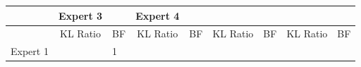 \documentclass[openright,titlepage,12pt,a4paper]{book}
\begin{document}
\begin{longtable}[]{@{}lclclclcl@{}}
\begin{minipage}[b]{0.06\columnwidth}
\strut
\end{minipage} & \begin{minipage}[b]{0.11\columnwidth}\centering
Expert 3\strut
\end{minipage} & \begin{minipage}[b]{0.07\columnwidth}\raggedright
\strut
\end{minipage} & \begin{minipage}[b]{0.10\columnwidth}\centering
Expert 4\strut
\end{minipage} & \begin{minipage}[b]{0.06\columnwidth}\raggedright
\strut
\end{minipage}\tabularnewline
\midrule
\endhead
\begin{minipage}[t]{0.11\columnwidth}\raggedright
\strut
\end{minipage} & \begin{minipage}[t]{0.10\columnwidth}\centering
KL Ratio\strut
\end{minipage} & \begin{minipage}[t]{0.06\columnwidth}\raggedright
BF\strut
\end{minipage} & \begin{minipage}[t]{0.11\columnwidth}\centering
KL Ratio\strut
\end{minipage} & \begin{minipage}[t]{0.06\columnwidth}\raggedright
BF\strut
\end{minipage} & \begin{minipage}[t]{0.11\columnwidth}\centering
KL Ratio\strut
\end{minipage} & \begin{minipage}[t]{0.07\columnwidth}\raggedright
BF\strut
\end{minipage} & \begin{minipage}[t]{0.10\columnwidth}\centering
KL Ratio\strut
\end{minipage} & \begin{minipage}[t]{0.06\columnwidth}\raggedright
BF\strut
\end{minipage}\tabularnewline
\begin{minipage}[t]{0.11\columnwidth}\raggedright
Expert 1\strut
\end{minipage} & \begin{minipage}[t]{0.10\columnwidth}\centering
1\strut
\end{minipage} & \begin{minipage}[t]{0.06\columnwidth}\raggedright
1\strut
\end{minipage} & \begin{minipage}[t]{0.11\columnwidth}\centering

\end{minipage}
\end{longtable}
\end{document}
